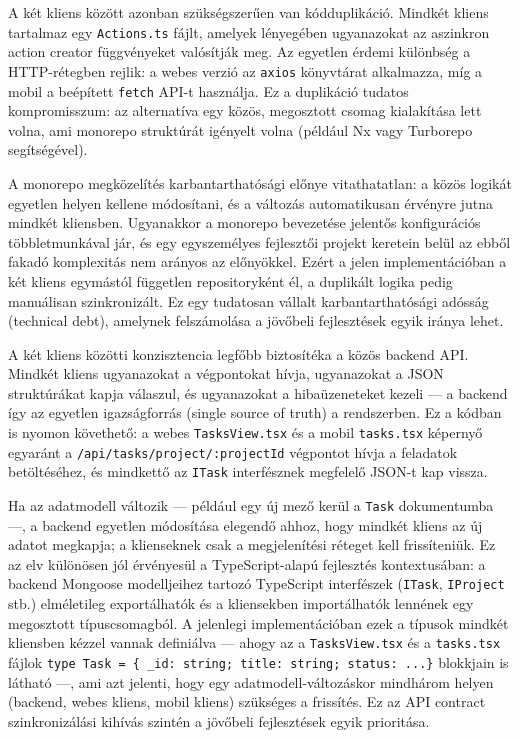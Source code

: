
A két kliens között azonban szükségszerűen van kódduplikáció. Mindkét kliens
tartalmaz egy \texttt{Actions.ts} fájlt, amelyek lényegében ugyanazokat az
aszinkron action creator függvényeket valósítják meg. Az egyetlen érdemi
különbség a HTTP-rétegben rejlik: a webes verzió az \texttt{axios} könyvtárat
alkalmazza, míg a mobil a beépített \texttt{fetch} API-t használja. Ez a
duplikáció tudatos kompromisszum: az alternatíva egy közös, megosztott csomag
kialakítása lett volna, ami monorepo struktúrát igényelt volna (például Nx
vagy Turborepo segítségével).

A monorepo megközelítés karbantarthatósági előnye vitathatatlan: a közös logikát
egyetlen helyen kellene módosítani, és a változás automatikusan érvényre jutna
mindkét kliensben. Ugyanakkor a monorepo bevezetése jelentős konfigurációs
többletmunkával jár, és egy egyszemélyes fejlesztői projekt keretein belül az
ebből fakadó komplexitás nem arányos az előnyökkel. Ezért a jelen
implementációban a két kliens egymástól független repositoryként él, a duplikált
logika pedig manuálisan szinkronizált. Ez egy tudatosan vállalt karbantarthatósági
adósság (technical debt), amelynek felszámolása a jövőbeli fejlesztések egyik
iránya lehet.


A két kliens közötti konzisztencia legfőbb biztosítéka a közös backend API.
Mindkét kliens ugyanazokat a végpontokat hívja, ugyanazokat a JSON struktúrákat
kapja válaszul, és ugyanazokat a hibaüzeneteket kezeli — a backend így az
egyetlen igazságforrás (single source of truth) a rendszerben. Ez a
kódban is nyomon követhető: a webes \texttt{TasksView.tsx} és a mobil
\texttt{tasks.tsx} képernyő egyaránt a \texttt{/api/tasks/project/:projectId}
végpontot hívja a feladatok betöltéséhez, és mindkettő az \texttt{ITask}
interfésznek megfelelő JSON-t kap vissza.

Ha az adatmodell változik — például egy új mező kerül a \texttt{Task}
dokumentumba —, a backend egyetlen módosítása elegendő ahhoz, hogy mindkét
kliens az új adatot megkapja; a klienseknek csak a megjelenítési réteget kell
frissíteniük. Ez az elv különösen jól érvényesül a TypeScript-alapú fejlesztés
kontextusában: a backend Mongoose modelljeihez tartozó TypeScript interfészek
(\texttt{ITask}, \texttt{IProject} stb.) elméletileg exportálhatók és a
kliensekben importálhatók lennének egy megosztott típuscsomagból. A jelenlegi
implementációban ezek a típusok mindkét kliensben kézzel vannak definiálva —
ahogy az a \texttt{TasksView.tsx} és a \texttt{tasks.tsx} fájlok
\texttt{type Task = \{ \_id: string; title: string; status: ...\}} blokkjain is
látható —, ami azt jelenti, hogy egy adatmodell-változáskor mindhárom helyen
(backend, webes kliens, mobil kliens) szükséges a frissítés. Ez az API contract
szinkronizálási kihívás szintén a jövőbeli fejlesztések egyik prioritása.

